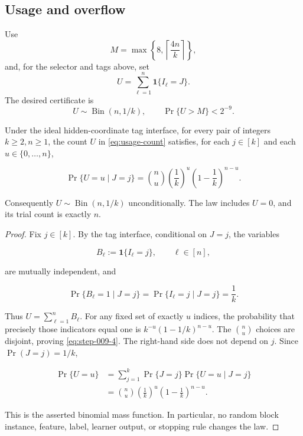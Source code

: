 \subsection{Usage and overflow}\label{app:step-009}
Use
\begin{equation}
M=\max\left\{8,\left\lceil\frac{4n}{k}\right\rceil\right\},
\tag{S9.1}\label{eq:overflow-budget}
\end{equation}
and, for the selector and tags above, set
\begin{equation}
U=\sum_{\ell=1}^n\mathbf 1\{I_\ell=J\}.
\tag{S9.2}\label{eq:usage-count}
\end{equation}
The desired certificate is
\begin{equation}
U\sim\operatorname{Bin}(n,1/k),
\qquad \Pr\{U>M\}<2^{-9}.
\tag{S9.3}\label{eq:overflow-certificate}
\end{equation}
\begin{lemma}\label{lem:step-009-usage-law}
Under the ideal hidden-coordinate tag interface, for every pair of
integers \(k\ge2,n\ge1\), the count \(U\) in \eqref{eq:usage-count} satisfies, for each
\(j\in[k]\) and each \(u\in\{0,\ldots,n\}\),

\[
\Pr\{U=u\mid J=j\}
=\binom nu\left(\frac1k\right)^u
 \left(1-\frac1k\right)^{n-u}.
\tag{S9.4}\label{eq:step-009-4}
\]

Consequently \(U\sim\operatorname{Bin}(n,1/k)\) unconditionally. The law
includes \(U=0\), and its trial count is exactly \(n\).
\end{lemma}

\begin{proof}
Fix \(j\in[k]\). By the tag interface, conditional on \(J=j\),
the variables

\[
B_\ell:=\mathbf1\{I_\ell=j\},\qquad \ell\in[n],
\]

are mutually independent, and

\[
\Pr\{B_\ell=1\mid J=j\}=\Pr\{I_\ell=j\mid J=j\}=\frac1k.
\]

Thus \(U=\sum_{\ell=1}^nB_\ell\). For any fixed set of exactly \(u\)
indices, the probability that precisely those indicators equal one is
\(k^{-u}(1-1/k)^{n-u}\). The \(\binom nu\) choices are disjoint, proving
\eqref{eq:step-009-4}. The right-hand side does not depend on \(j\). Since
\(\Pr(J=j)=1/k\),

\[
\begin{aligned}
\Pr\{U=u\}
&=\sum_{j=1}^k\Pr\{J=j\}\Pr\{U=u\mid J=j\}\\
&=\binom nu\left(\frac1k\right)^u
 \left(1-\frac1k\right)^{n-u}.
\end{aligned}
\]

This is the asserted binomial mass function. In particular, no random block
instance, feature, label, learner output, or stopping rule changes the law.
\end{proof}


